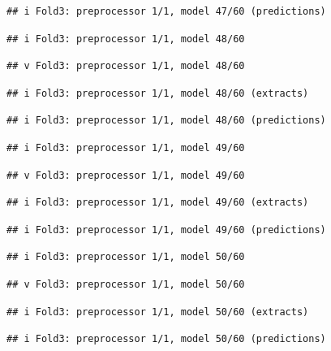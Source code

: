 \documentclass[
]{article}
\begin{document}
\begin{verbatim}
## i Fold3: preprocessor 1/1, model 47/60 (predictions)
\end{verbatim}

\begin{verbatim}
## i Fold3: preprocessor 1/1, model 48/60
\end{verbatim}

\begin{verbatim}
## v Fold3: preprocessor 1/1, model 48/60
\end{verbatim}

\begin{verbatim}
## i Fold3: preprocessor 1/1, model 48/60 (extracts)
\end{verbatim}

\begin{verbatim}
## i Fold3: preprocessor 1/1, model 48/60 (predictions)
\end{verbatim}

\begin{verbatim}
## i Fold3: preprocessor 1/1, model 49/60
\end{verbatim}

\begin{verbatim}
## v Fold3: preprocessor 1/1, model 49/60
\end{verbatim}

\begin{verbatim}
## i Fold3: preprocessor 1/1, model 49/60 (extracts)
\end{verbatim}

\begin{verbatim}
## i Fold3: preprocessor 1/1, model 49/60 (predictions)
\end{verbatim}

\begin{verbatim}
## i Fold3: preprocessor 1/1, model 50/60
\end{verbatim}

\begin{verbatim}
## v Fold3: preprocessor 1/1, model 50/60
\end{verbatim}

\begin{verbatim}
## i Fold3: preprocessor 1/1, model 50/60 (extracts)
\end{verbatim}

\begin{verbatim}
## i Fold3: preprocessor 1/1, model 50/60 (predictions)
\end{verbatim}
\end{document}
